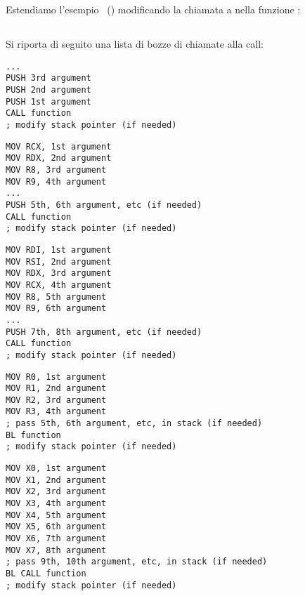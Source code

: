 \section{\PrintfSeveralArgumentsSectionName}

Estendiamo l'esempio \IT{\HelloWorldSectionName}~() modificando la chiamata a  \printf nella funzione \main:







\subsection{\Conclusion{}}

Si riporta di seguito una lista di bozze di chiamate alla call:

\begin{lstlisting}[caption=x86]
...
PUSH 3rd argument
PUSH 2nd argument
PUSH 1st argument
CALL function
; modify stack pointer (if needed)
\end{lstlisting}

\begin{lstlisting}[caption=x64 (MSVC)]
MOV RCX, 1st argument
MOV RDX, 2nd argument
MOV R8, 3rd argument
MOV R9, 4th argument
...
PUSH 5th, 6th argument, etc (if needed)
CALL function
; modify stack pointer (if needed)
\end{lstlisting}

\begin{lstlisting}[caption=x64 (GCC)]
MOV RDI, 1st argument
MOV RSI, 2nd argument
MOV RDX, 3rd argument
MOV RCX, 4th argument
MOV R8, 5th argument
MOV R9, 6th argument
...
PUSH 7th, 8th argument, etc (if needed)
CALL function
; modify stack pointer (if needed)
\end{lstlisting}

\begin{lstlisting}[caption=ARM]
MOV R0, 1st argument
MOV R1, 2nd argument
MOV R2, 3rd argument
MOV R3, 4th argument
; pass 5th, 6th argument, etc, in stack (if needed)
BL function
; modify stack pointer (if needed)
\end{lstlisting}

\begin{lstlisting}[caption=ARM64]
MOV X0, 1st argument
MOV X1, 2nd argument
MOV X2, 3rd argument
MOV X3, 4th argument
MOV X4, 5th argument
MOV X5, 6th argument
MOV X6, 7th argument
MOV X7, 8th argument
; pass 9th, 10th argument, etc, in stack (if needed)
BL CALL function
; modify stack pointer (if needed)
\end{lstlisting}

